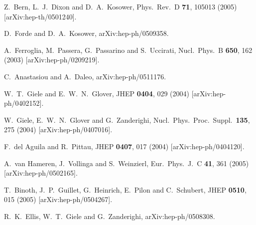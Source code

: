 \documentclass[12pt]{iopart}
\begin{document}
\begin{thebibliography}{99}
  Z.~Bern, L.~J.~Dixon and D.~A.~Kosower,
  Phys.\ Rev.\ D {\bf 71}, 105013 (2005)
  [arXiv:hep-th/0501240].

  D.~Forde and D.~A.~Kosower,
  arXiv:hep-ph/0509358.

  A.~Ferroglia, M.~Passera, G.~Passarino and S.~Uccirati,
  Nucl.\ Phys.\ B {\bf 650}, 162 (2003)
  [arXiv:hep-ph/0209219].
  
  C.~Anastasiou and A.~Daleo,
  arXiv:hep-ph/0511176.
  
  W.~T.~Giele and E.~W.~N.~Glover,
  JHEP {\bf 0404}, 029 (2004)
  [arXiv:hep-ph/0402152].
  
  W.~Giele, E.~W.~N.~Glover and G.~Zanderighi,
  Nucl.\ Phys.\ Proc.\ Suppl.\  {\bf 135}, 275 (2004)
  [arXiv:hep-ph/0407016].

  F.~del Aguila and R.~Pittau,
  JHEP {\bf 0407}, 017 (2004)
  [arXiv:hep-ph/0404120].
  
  A.~van Hameren, J.~Vollinga and S.~Weinzierl,
  Eur.\ Phys.\ J.\ C {\bf 41}, 361 (2005)
  [arXiv:hep-ph/0502165].
  
  T.~Binoth, J.~P.~Guillet, G.~Heinrich, E.~Pilon and C.~Schubert,
  JHEP {\bf 0510}, 015 (2005)
  [arXiv:hep-ph/0504267].
  
  R.~K.~Ellis, W.~T.~Giele and G.~Zanderighi,
  arXiv:hep-ph/0508308.
  

\end{thebibliography}
\end{document}
